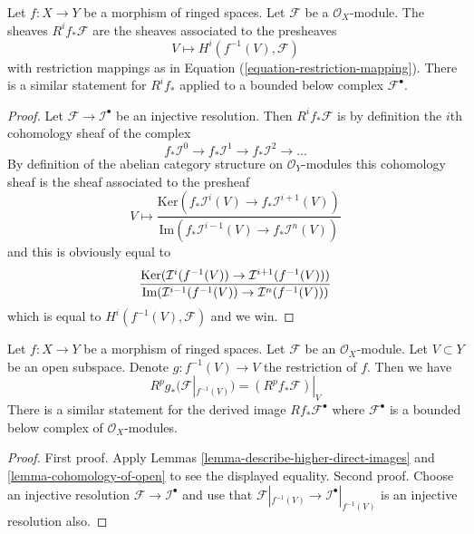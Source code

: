 \begin{lemma}
\label{lemma-describe-higher-direct-images}
Let $f : X \to Y$ be a morphism of ringed spaces.
Let $\mathcal{F}$ be a $\mathcal{O}_X$-module.
The sheaves $R^if_*\mathcal{F}$ are the sheaves
associated to the presheaves
$$
V \longmapsto H^i(f^{-1}(V), \mathcal{F})
$$
with restriction mappings as in Equation (\ref{equation-restriction-mapping}).
There is a similar statement for $R^if_*$ applied to a
bounded below complex $\mathcal{F}^\bullet$.
\end{lemma}

\begin{proof}
Let $\mathcal{F} \to \mathcal{I}^\bullet$ be an injective resolution.
Then $R^if_*\mathcal{F}$ is by definition the $i$th cohomology sheaf
of the complex
$$
f_*\mathcal{I}^0 \to f_*\mathcal{I}^1 \to f_*\mathcal{I}^2 \to \ldots
$$
By definition of the abelian category structure on $\mathcal{O}_Y$-modules
this cohomology sheaf is the sheaf associated to the presheaf
$$
V
\longmapsto
\frac{\text{Ker}(f_*\mathcal{I}^i(V) \to f_*\mathcal{I}^{i + 1}(V))}
{\text{Im}(f_*\mathcal{I}^{i - 1}(V) \to f_*\mathcal{I}^n(V))}
$$
and this is obviously equal to
$$
\frac{\text{Ker}(\mathcal{I}^i(f^{-1}(V)) \to \mathcal{I}^{i + 1}(f^{-1}(V)))}
{\text{Im}(\mathcal{I}^{i - 1}(f^{-1}(V)) \to \mathcal{I}^n(f^{-1}(V)))} \\
$$
which is equal to $H^i(f^{-1}(V), \mathcal{F})$
and we win.
\end{proof}

\begin{lemma}
\label{lemma-localize-higher-direct-images}
Let $f : X \to Y$ be a morphism of ringed spaces.
Let $\mathcal{F}$ be an $\mathcal{O}_X$-module.
Let $V \subset Y$ be an open subspace.
Denote $g : f^{-1}(V) \to V$ the restriction of $f$.
Then we have
$$
R^pg_*(\mathcal{F}|_{f^{-1}(V)}) = (R^pf_*\mathcal{F})|_V
$$
There is a similar statement for the
derived image $Rf_*\mathcal{F}^\bullet$ where $\mathcal{F}^\bullet$
is a bounded below complex of $\mathcal{O}_X$-modules.
\end{lemma}

\begin{proof}
First proof. Apply Lemmas \ref{lemma-describe-higher-direct-images}
and \ref{lemma-cohomology-of-open} to see the displayed equality.
Second proof. Choose an injective resolution
$\mathcal{F} \to \mathcal{I}^\bullet$
and use that $\mathcal{F}|_{f^{-1}(V)} \to \mathcal{I}^\bullet|_{f^{-1}(V)}$
is an injective resolution also.
\end{proof}







